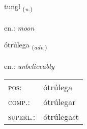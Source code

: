 \documentclass[frontgrid, backgrid]{flacards}\usepackage[]{graphicx}\usepackage[]{xcolor}
\begin{document}
\renewcommand{\flhead}{\vskip5pt \fboxsep=0pt {\small\bfseries\footnotesize Nafnorð | Noun}}
\renewcommand{\fcfoot}{\vskip5pt \fboxsep=0pt \hspace{2pt}{\small\bfseries\footnotesize 2K}}

\renewcommand{\blhead}{\vskip5pt {\small\bfseries\footnotesize Nafnorð | Noun }}
\renewcommand{\bcfoot}{\vskip5pt \hspace{2pt}{\small\bfseries\footnotesize 2K}}


{tungl \small{\textsubscript{(\textit{n.})}} \\[1ex] %
\textphonetic{[tʰuŋl]} \\
en.: \emph{moon} \\  [2ex]
\renewcommand*{\arraystretch}{0.8}
}

\renewcommand{\flhead}{\vskip5pt \fboxsep=0pt {\small\bfseries\footnotesize Atviksorð | Adverb}}
\renewcommand{\fcfoot}{\vskip5pt \fboxsep=0pt \hspace{2pt}{\small\bfseries\footnotesize 2K}}

\renewcommand{\blhead}{\vskip5pt {\small\bfseries\footnotesize Atviksorð | Adverb }}
\renewcommand{\bcfoot}{\vskip5pt \hspace{2pt}{\small\bfseries\footnotesize 2K}}


{ótrúlega \small{\textsubscript{(\textit{adv.})}} \\[1ex] %
\textphonetic{[ouːtʰrulɛɣa]} \\
en.: \emph{unbelievably} \\  [2ex]
\renewcommand*{\arraystretch}{0.8}
\begin{tabular}{ll}
\textsc{pos}: & ótrúlega \\ 
\textsc{comp.}: & ótrúlegar \\ 
\textsc{superl.}: & ótrúlegast \\
\end{tabular}
}
\end{document}
